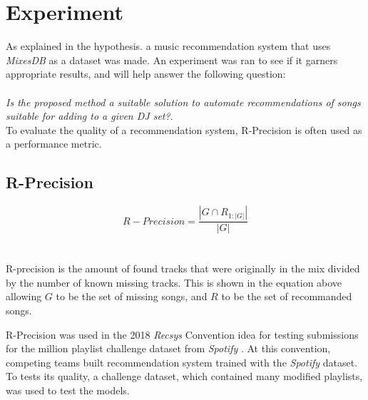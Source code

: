 
\graphicspath{{Chapter5/}}


\chapter{Experiment}


As explained in the hypothesis. a music recommendation system that uses \textit{MixesDB} as a dataset was made. An experiment was ran to see if it garners appropriate results, and will help answer the following question:
\\
\\
\textit{Is the proposed method a suitable solution to automate recommendations of songs suitable for adding to a given DJ set?}.
\\

To evaluate the quality of a recommendation system, R-Precision is often used as a performance metric. 
\\

\section{R-Precision}

\begin{equation}
	R-Precision = \frac{|G\cap R_{1:|G|}|}{|G|}
\end{equation}
\\\\
R-precision is the amount of found tracks that were originally in the mix divided by the number of known missing tracks. This is shown in the equation above allowing $G$ to be the set of missing songs, and $R$ to be the set of recommanded songs.

R-Precision was used in the 2018 \textit{Recsys} Convention idea for testing submissions for the million playlist challenge dataset from \textit{Spotify} \citep{aicrowd_aicrowd_2023}. At this convention, competing teams built recommendation system trained with the \textit{Spotify} dataset. To tests its quality, a challenge dataset, which contained many modified playlists, was used to test the models.


